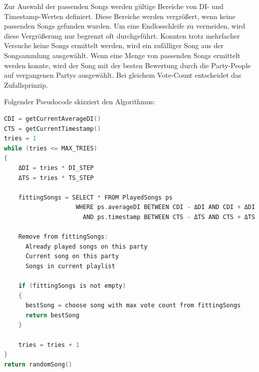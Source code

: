 Zur Auswahl der passenden Songs werden gültige Bereiche von DI- und Timestamp-Werten definiert.
Diese Bereiche werden vergrößert, wenn keine passenden Songs gefunden wurden. Um eine Endlosschleife
zu vermeiden, wird diese Vergrößerung nur begrenzt oft durchgeführt. Konnten trotz mehrfacher 
Versuche keine Songs ermittelt werden, wird ein zufälliger Song aus der Songsammlung ausgewählt.
Wenn eine Menge von passenden Songs ermittelt werden konnte, wird der Song mit der besten
Bewertung durch die Party-People auf vergangenen Partys ausgewählt. Bei gleichem Vote-Count
entscheidet das Zufallsprinzip. 

\newpage
Folgender Pseudocode skizziert den Algorithmus:
\begin{lstlisting}[language=C]
CDI = getCurrentAverageDI()
CTS = getCurrentTimestamp()
tries = 1
while (tries <= MAX_TRIES)
{
	ΔDI = tries * DI_STEP
	ΔTS = tries * TS_STEP
	
	fittingSongs = SELECT * FROM PlayedSongs ps
                    WHERE ps.averageDI BETWEEN CDI - ΔDI AND CDI + ΔDI
                      AND ps.timestamp BETWEEN CTS - ΔTS AND CTS + ΔTS
				   	 
	Remove from fittingSongs: 
	  Already played songs on this party
	  Current song on this party
	  Songs in current playlist
		
	if (fittingSongs is not empty)
	{
	  bestSong = choose song with max vote count from fittingSongs
	  return bestSong
	}
	
	tries = tries + 1
}
return randomSong()
\end{lstlisting}